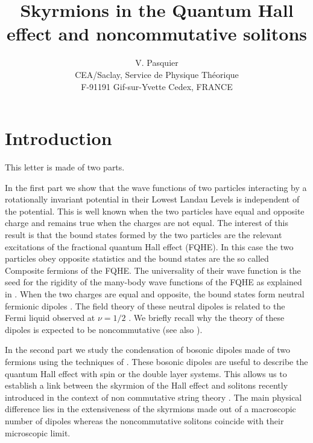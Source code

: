 \documentclass[a4paper,11pt]{article}
\title{ Skyrmions in the Quantum Hall effect and noncommutative solitons}
\author{V. Pasquier\\
CEA/Saclay, Service de Physique Th\'eorique\\
F-91191 Gif-sur-Yvette Cedex, FRANCE
}
\begin{document}
\maketitle
{}



\section{Introduction}
\smallskip

This letter is made of two parts.

In the first part we show that the wave functions of two particles interacting
by a rotationally invariant potential in their Lowest Landau Levels is 
independent of the potential. This is well known \cite{LER}  when the two particles 
have equal and opposite charge and remains true when the charges are not equal.
The interest of this result is that the bound states formed by the two
particles are the relevant excitations of the fractional quantum Hall effect (FQHE).
In this case the two particles obey opposite
statistics and the bound states are the so called Composite fermions of the FQHE.
The universality of their
wave function is the seed for the rigidity of the many-body wave functions
of the FQHE \cite{JAIN} as explained in \cite{PAHA}. 
When the two charges are equal and opposite, the 
bound states form neutral
fermionic dipoles \cite{PAHA,READ}.
The field theory of these neutral dipoles is  related to the 
Fermi liquid observed at $\nu=1/2$ \cite{HALP}.
We briefly recall why the theory of these dipoles is expected to be noncommutative
(see also \cite{SUS,SUS1}).

In the second part
we study the condensation of bosonic dipoles made of two fermions
using the
techniques of \cite{PAHA}. 
These bosonic dipoles are useful to describe the quantum Hall effect
with spin
or the double layer systems.
This allows us to establish a link
between the skyrmion of the Hall effect 
\cite{REZ,SON}  and solitons
recently introduced in the context of non commutative string theory
\cite{GOP,MUK,HAR,WIT}.
The main physical difference 
lies in the extensiveness of the skyrmions
made out of a macroscopic number of dipoles whereas the noncommutative solitons
\cite{WIT}
coincide with their microscopic limit.
\end{document}
